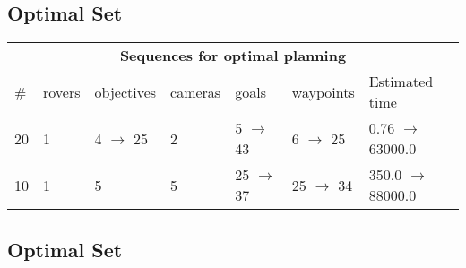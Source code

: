 \documentclass{article}
\begin{document}
                            \subsection*{Optimal Set}

                            \begin{center}
                            \begin{tabular}{@{}l|l|l|l|l|l|l@{}}
                            \multicolumn{7}{c}{\bf \large Sequences for optimal planning}\\
                            \# & rovers & objectives & cameras & goals & waypoints & Estimated time\\\midrule
                            20&1&4 $\rightarrow$ 25&2&5 $\rightarrow$ 43&6 $\rightarrow$ 25&0.76 $\rightarrow$ 63000.0\\
10&1&5&5&25 $\rightarrow$ 37&25 $\rightarrow$ 34&350.0 $\rightarrow$ 88000.0
                            \end{tabular}
                            \end{center}
                    
                                \subsection*{Optimal Set}
                                
\end{document}
